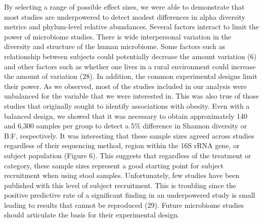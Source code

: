 \documentclass[12pt,]{article}
\begin{document}
By selecting a range of possible effect sizes, we were able to
demonstrate that most studies are underpowered to detect modest
differences in alpha diversity metrics and phylum-level relative
abundances. Several factors interact to limit the power of microbiome
studies. There is wide interpersonal variation in the diversity and
structure of the human microbiome. Some factors such as relationship
between subjects could potentially decrease the amount variation (6) and
other factors such as whether one lives in a rural environment could
increase the amount of variation (28). In addition, the common
experimental designs limit their power. As we observed, most of the
studies included in our analysis were unbalanced for the variable that
we were interested in. This was also true of those studies that
originally sought to identify associations with obesity. Even with a
balanced design, we showed that it was necessary to obtain approximately
140 and 6,300 samples per group to detect a 5\% difference in Shannon
diversity or B:F, respectively. It was interesting that these sample
sizes agreed across studies regardless of their sequencing method,
region within the 16S rRNA gene, or subject population (Figure 6). This
suggests that regardless of the treatment or category, these sample
sizes represent a good starting point for subject recruitment when using
stool samples. Unfortunately, few studies have been published with this
level of subject recruitment. This is troubling since the positive
predictive rate of a significant finding in an underpowered study is
small leading to results that cannot be reproduced (29). Future
microbiome studies should articulate the basis for their experimental
design.
\end{document}
